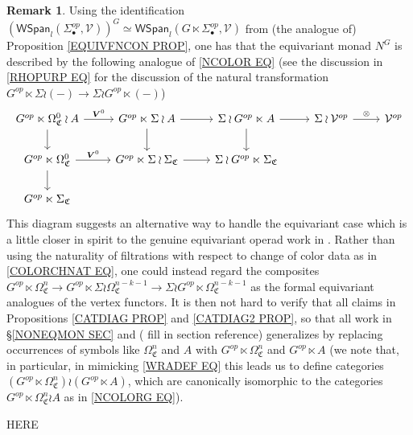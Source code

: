 \documentclass[a4paper,10pt
,draft
]{article}%
\numberwithin{equation}{section}
\numberwithin{figure}{section}
\theoremstyle{definition} %
\newtheorem{remark}[equation]{Remark}%
\newcommand{\1}{\ensuremath{\mathbbm 1}}%
\newcommand{\OC}{\Omega_{\mathfrak C}}
\begin{document}
\begin{remark}
Using the identification
$
\left(
\mathsf{WSpan}_l
\left(\Sigma_{\bullet}^{op},\mathcal{V}\right)
\right)^G
\simeq
\mathsf{WSpan}_l
\left(G \ltimes \Sigma_{\bullet}^{op},\mathcal{V}\right)
$
from (the analogue of) Proposition \ref{EQUIVFNCON PROP},
one has that the equivariant monad $N^G$
is described by the following analogue of \eqref{NCOLOR EQ}
(see the discussion in \eqref{RHOPURP EQ} for the discussion of the natural transformation
$G^{op} \ltimes \Sigma \wr (-) \to \Sigma \wr G^{op} \ltimes (-)$)
\begin{equation}\label{NCOLORG EQ}
\begin{tikzcd}
	G^{op} \ltimes \Omega^0_{\mathfrak{C}} \wr A \ar{r}{\boldsymbol{V}^0} \ar{d} &
	G^{op} \ltimes \Sigma \wr A  \ar{d} \ar{r} &
	\Sigma \wr G^{op} \ltimes A  \ar{d} \ar{r} &
	\Sigma \wr \mathcal{V}^{op} \ar{r}{\otimes} &
	\mathcal{V}^{op}
\\
	G^{op} \ltimes \Omega^0_{\mathfrak{C}} \ar{r}{\boldsymbol{V}^0} \ar{d} &
	G^{op} \ltimes \Sigma \wr \Sigma_{\mathfrak{C}} \ar{r} &
	\Sigma \wr G^{op} \ltimes \Sigma_{\mathfrak{C}} 
\\
	G^{op} \ltimes \Sigma_{\mathfrak{C}}
\end{tikzcd}
\end{equation}
This diagram suggests an alternative way to handle the equivariant case which is a little closer in spirit to the genuine equivariant operad work in \cite{BP_geo}.
Rather than using the naturality of filtrations with respect to change of color data as in \eqref{COLORCHNAT EQ},
one could instead regard the composites
$G^{op} \ltimes \OC^n \to 
G^{op} \ltimes \Sigma \wr \OC^{n-k-1} \to
\Sigma \wr G^{op} \ltimes  \OC^{n-k-1}$
as the formal equivariant analogues of the vertex functors.
It is then not hard to verify that all claims in Propositions \ref{CATDIAG PROP} and \ref{CATDIAG2 PROP},
so that all work in \S \ref{NONEQMON SEC} 
and ({\color{blue} fill in section reference})
generalizes by replacing occurrences 
of symbols like $\OC^{n}$ and $A$ with 
$G^{op} \ltimes \OC^{n}$ and $G^{op} \ltimes A$
(we note that, in particular,
in mimicking \eqref{WRADEF EQ}
this leads us to define categories 
$\left(G^{op} \ltimes \OC^{n}\right)
\wr
\left(G^{op} \ltimes A\right)$,
which are canonically isomorphic to the categories
$G^{op} \ltimes \OC^{n}
\wr A$ as in \eqref{NCOLORG EQ}).
\end{remark}


{\color{blue} HERE}
\end{document}
